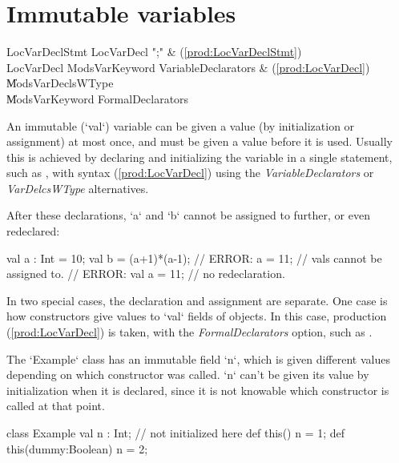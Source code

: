 \section{Immutable variables}
\label{FinalVariables}

\begin{bbgrammar}
      LocVarDeclStmt \: LocVarDecl \xcd";" & (\ref{prod:LocVarDeclStmt}) \\
          LocVarDecl \: Mods\opt VarKeyword VariableDeclarators & (\ref{prod:LocVarDecl}) \\
                     \| Mods\opt VarDeclsWType \\
                     \| Mods\opt VarKeyword FormalDeclarators \\
\end{bbgrammar}

An immutable (\xcd`val`) variable can be given a value (by initialization or
assignment) at 
most once, and must be given a value before it is used.  Usually this is
achieved by declaring and initializing the variable in a single statement, 
such as , with syntax 
(\ref{prod:LocVarDecl}) using the {\it VariableDeclarators} or {\it
VarDelcsWType} alternatives.

\begin{ex}
After these declarations, \xcd`a` and \xcd`b` cannot be assigned to further,
or even redeclared:  
\begin{xten}
val a : Int = 10;
val b = (a+1)*(a-1);
// ERROR: a = 11;  // vals cannot be assigned to.
// ERROR: val a = 11; // no redeclaration.
\end{xten}

\end{ex}

In two special cases, the declaration and assignment are separate.  One 
case is how constructors give values to \xcd`val` fields of objects.  In this
case, production (\ref{prod:LocVarDecl}) is taken, with the {\it
FormalDeclarators} option, such as  .  

\begin{ex} The
\xcd`Example` class has an immutable field \xcd`n`, which is given different
values depending on which constructor was called. \xcd`n` can't be given its
value by initialization when it is declared, since it is not knowable which
constructor is called at that point.  
\begin{xten}
class Example {
  val n : Int; // not initialized here
  def this() { n = 1; }
  def this(dummy:Boolean) { n = 2;}
}
\end{xten}
%
\end{ex}


